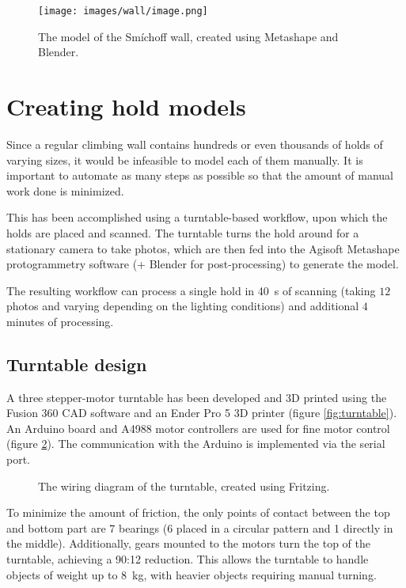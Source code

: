 \begin{figure}[H]
	\centering
	\texttt{[image: images/wall/image.png]}
	\caption{The model of the Smíchoff wall, created using Metashape and Blender.}
	\label{fig:model}
\end{figure}


\section{Creating hold models}
Since a regular climbing wall contains hundreds or even thousands of holds of varying sizes, it would be infeasible to model each of them manually.
It is important to automate as many steps as possible so that the amount of manual work done is minimized.

This has been accomplished using a turntable-based workflow, upon which the holds are placed and scanned.
The turntable turns the hold around for a stationary camera to take photos, which are then fed into the Agisoft Metashape protogrammetry software (+ Blender for post-processing) to generate the model.

The resulting workflow can process a single hold in \SI{40}{\second} of scanning (taking $12$ photos and varying depending on the lighting conditions) and additional $4$ minutes of processing.

\subsection{Turntable design}
A three stepper-motor turntable has been developed and 3D printed using the Fusion 360 CAD software and an Ender Pro 5 3D printer (figure \ref{fig:turntable}).
An Arduino board and A4988 motor controllers are used for fine motor control (figure \ref{fig:wiring}).
The communication with the Arduino is implemented via the serial port.

\begin{figure}
	\centering
	
	\caption{The wiring diagram of the turntable, created using Fritzing.}
	\label{fig:wiring}
\end{figure}

To minimize the amount of friction, the only points of contact between the top and bottom part are 7 bearings (6 placed in a circular pattern and 1 directly in the middle).
Additionally, gears mounted to the motors turn the top of the turntable, achieving a 90:12 reduction.
This allows the turntable to handle objects of weight up to \SI{8}{\kilo\gram}, with heavier objects requiring manual turning.

